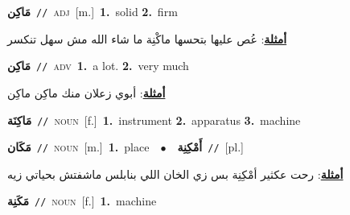 \documentclass[10pt,a4paper,twoside]{article} %
\begin{document}
\begin{multicols}{2}
{\setlength\topsep{0pt}\textbf{\foreignlanguage{arabic}{مَاكِن}}\ {\color{gray}\texttt{//}\color{black}}\ \textsc{adj}\ [m.]\ \textbf{1.}~solid  \textbf{2.}~firm\  \begin{flushright}\color{gray}\foreignlanguage{arabic}{\textbf{\underline{\foreignlanguage{arabic}{أمثلة}}}: عُص عليها بتحسها ماكْنِة ما شاء الله مش سهل تنكسر}\end{flushright}\color{black}} \vspace{2mm}

{\setlength\topsep{0pt}\textbf{\foreignlanguage{arabic}{مَاكِن}}\ {\color{gray}\texttt{//}\color{black}}\ \textsc{adv}\ \textbf{1.}~a lot.  \textbf{2.}~very much\  \begin{flushright}\color{gray}\foreignlanguage{arabic}{\textbf{\underline{\foreignlanguage{arabic}{أمثلة}}}: أبوي زعلان منك ماكِن ماكِن}\end{flushright}\color{black}} \vspace{2mm}

{\setlength\topsep{0pt}\textbf{\foreignlanguage{arabic}{مَاكِنَة}}\ {\color{gray}\texttt{//}\color{black}}\ \textsc{noun}\ [f.]\ \textbf{1.}~instrument  \textbf{2.}~apparatus  \textbf{3.}~machine\ } \vspace{2mm}

{\setlength\topsep{0pt}\textbf{\foreignlanguage{arabic}{مَكَان}}\ {\color{gray}\texttt{//}\color{black}}\ \textsc{noun}\ [m.]\ \textbf{1.}~place\ \ $\bullet$\ \ \setlength\topsep{0pt}\textbf{\foreignlanguage{arabic}{أَمْكِنِة}}\ {\color{gray}\texttt{//}\color{black}}\ [pl.]\  \begin{flushright}\color{gray}\foreignlanguage{arabic}{\textbf{\underline{\foreignlanguage{arabic}{أمثلة}}}: رحت عكثير أمْكِنِة بس زي الخان اللي بنابلس ماشفتش بحياتي زيه}\end{flushright}\color{black}} \vspace{2mm}

{\setlength\topsep{0pt}\textbf{\foreignlanguage{arabic}{مَكَنِة}}\ {\color{gray}\texttt{//}\color{black}}\ \textsc{noun}\ [f.]\ \textbf{1.}~machine\ } \vspace{2mm}


\end{multicols}
\end{document}
